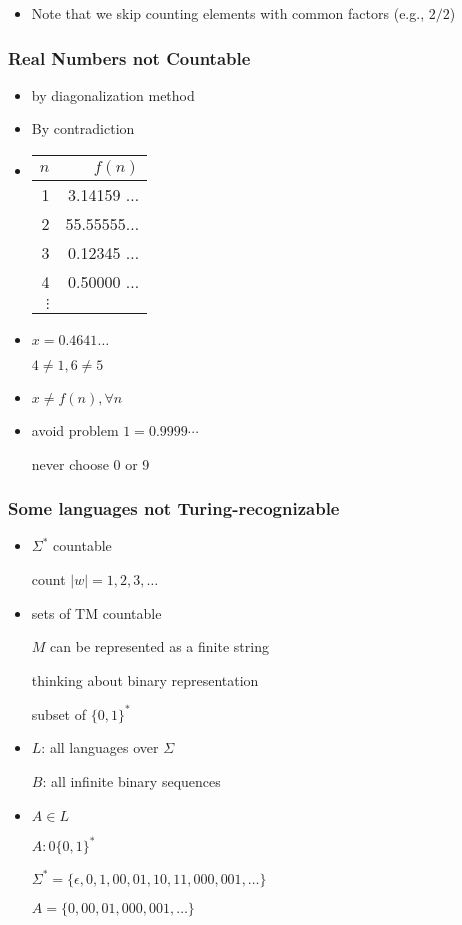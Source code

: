 \begin{frame}[allowframebreaks]
\begin{itemize}
\item Note that we skip counting elements with common factors (e.g., $2/2$)
\end{itemize}\end{frame} \begin{frame}[allowframebreaks] \frametitle{Real Numbers not Countable}
  \begin{itemize}
\item by diagonalization method
\item By contradiction
\item 

  \begin{tabular}{r|r}
$n$ & $f(n)$ \\ \hline
1 & 3.14159 $\ldots$\\
2 & 55.55555$\ldots$\\
3 & 0.12345 $\ldots$ \\
4 & 0.50000 $\ldots$ \\
$\vdots$ & 
  \end{tabular}

\item $x=0.4641\ldots$

$4\neq 1, 6 \neq 5$
\item $x \neq f(n), \forall n$
\item avoid problem $1=0.9999\cdots$

never choose 0 or 9
\end{itemize}\end{frame} \begin{frame}[allowframebreaks] \frametitle{Some languages not Turing-recognizable}
    \begin{itemize}
\item $\Sigma^*$ countable

count $|w|=1,2,3,\ldots$
\item sets of TM countable

$M$ can be represented as a finite string 

thinking about binary representation

subset of $\{0,1\}^*$


\item $L$: all languages over $\Sigma$

$B$: all infinite binary sequences
\item $A\in L$

$A: 0 \{0,1\}^*$

$\Sigma^*=\{\epsilon,0,1,00,01,10,11,000,001,\ldots\}$

$A=\{0, 00, 01, 000, 001, \ldots\}$


\end{itemize}
\end{frame}
